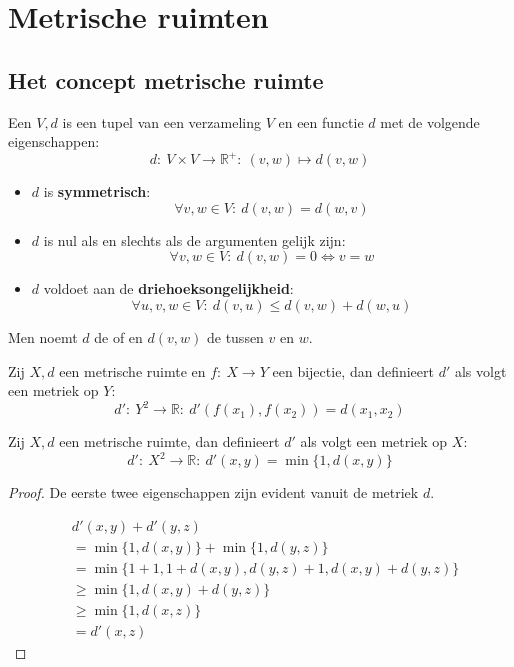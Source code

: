 \documentclass[main.tex]{subfiles}
\begin{document}
\chapter{Metrische ruimten}
\label{cha:metrische-ruimten}

\section{Het concept metrische ruimte}
\label{sec:het-conc-metr}

\begin{de}
  \label{de:metrische-ruimte}
  Een  $V,d$ is een tupel van een verzameling $V$ en een functie $d$ met de volgende eigenschappen:
  \[ d:\ V \times V \rightarrow \mathbb{R}^{+}:\ (v,w) \mapsto d(v,w) \]
  \begin{itemize}
  \item $d$ is \textbf{symmetrisch}:
    \[ \forall v,w \in V:\ d(v,w) = d(w,v) \]
  \item $d$ is nul als en slechts als de argumenten gelijk zijn:
    \[ \forall v,w \in V:\ d(v,w) = 0 \Leftrightarrow v = w \]
  \item $d$ voldoet aan de \textbf{driehoeksongelijkheid}:
    \[ \forall u,v,w \in V:\ d(v,u) \le d(v,w) + d(w,u) \]
  \end{itemize}
  Men noemt $d$ de  of  en $d(v,w)$ de  tussen $v$ en $w$.
\end{de}

\begin{st}
  Zij $X,d$ een metrische ruimte en $f:\ X \rightarrow Y$ een bijectie, dan definieert $d'$ als volgt een metriek op $Y$:
  \[ d':\ Y^{2}\rightarrow \mathbb{R}:\ d'(f(x_{1}),f(x_{2})) = d(x_{1},x_{2}) \]

\end{st}

\begin{st}
  Zij $X,d$ een metrische ruimte, dan definieert $d'$ als volgt een metriek op $X$:
  \[ d':\ X^{2}\rightarrow \mathbb{R}:\ d'(x,y) = \min\{1,d(x,y)\} \]

  \begin{proof}
    De eerste twee eigenschappen zijn evident vanuit de metriek $d$.

    \begin{align*}
      & d'(x,y)+d'(y,z)\\
      & = \min\{1,d(x,y)\} + \min\{1,d(y,z)\}\\
      & = \min\{1+1,1+d(x,y),d(y,z)+1,d(x,y)+d(y,z)\} \\
      & \ge \min\{1,d(x,y)+d(y,z)\} \\
      & \ge  \min\{1,d(x,z)\}\\
      & = d'(x,z)
    \end{align*}
  \end{proof}
\end{st}
\end{document}
